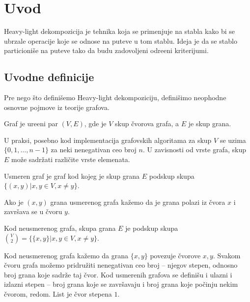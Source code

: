 \section{Uvod}

Heavy-light dekompozicija je tehnika koja se primenjuje na stabla kako bi se ubrzale operacije koje se odnose na puteve u tom stablu. Ideja je da se stablo particioni\v se na puteve tako da budu zadovoljeni odre\dj eni kriterijumi.

\subsection{Uvodne definicije}


Pre nego \v sto defini\v semo Heavy-light dekompoziciju, defini\v simo neophodne osnovne pojmove iz teorije grafova.

\begin{dfn}
Graf je ure\dj eni par $(V,E)$, gde je $V$ skup \v cvorova grafa, a $E$ je skup grana.
\end{dfn}

U praksi, posebno kod implementacija grafovskih algoritama za skup $V$ se uzima $\{0, 1, \ldots, n-1\}$ za neki nenegativan ceo broj $n$. U zavisnosti od vrste grafa, skup $E$ mo\v ze sadr\v zati razli\v cite vrste elemenata.

\begin{dfn}
Usmeren graf je graf kod kojeg je skup grana $E$ podskup skupa \newline $\{(x,y) | x,y \in V, x\not = y\}$.
\end{dfn}

Ako je $(x,y)$ grana usmerenog grafa ka\v zemo da je grana polazi iz \v cvora $x$ i zavr\v sava se u \v cvoru $y$.

\begin{dfn}
Kod neusmerenog grafa, skupa grana $E$ je podskup skupa $\binom V2 = \{\{x,y\} | x,y \in V, x \not = y\}$.
\end{dfn}

Kod neusmerenog grafa ka\v zemo da grana $\{x,y\}$ povezuje \v cvorove $x,y$. Svakom \v cvoru grafa mo\v zemo pridru\v ziti nenegativan ceo broj -- njegov stepen, odnosno broj grana koje sadr\v ze taj \v cvor. Kod usmerenih grafova se defini\v su i ulazni i izlazni stepen -- broj grana koje se zavr\v savaju i broj grana koje po\v cinju nekim \v cvorom, redom. List je \v cvor stepena $1$.

